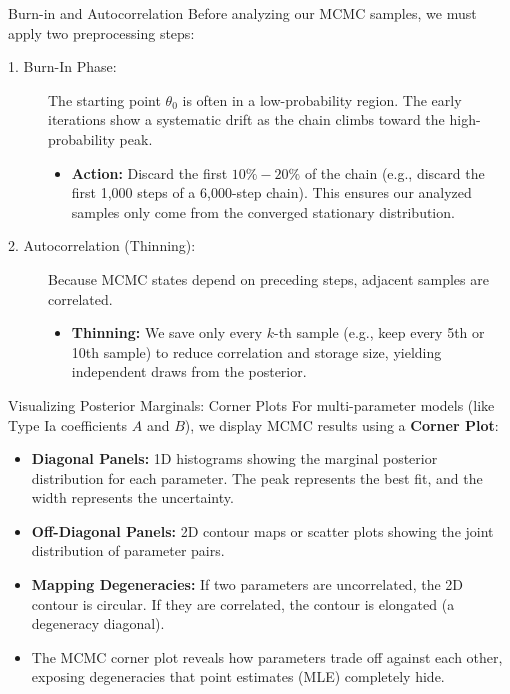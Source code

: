\documentclass[9pt]{beamer}
\begin{document}
\begin{frame}{Burn-in and Autocorrelation}
  Before analyzing our MCMC samples, we must apply two preprocessing steps:
  \begin{description}
    \item[1. Burn-In Phase:]
      The starting point $\theta_0$ is often in a low-probability region. The early iterations show a systematic drift as the chain climbs toward the high-probability peak.
      \begin{itemize}
        \item \textbf{Action:} Discard the first $10\% - 20\%$ of the chain (e.g., discard the first 1,000 steps of a 6,000-step chain). This ensures our analyzed samples only come from the converged stationary distribution.
      \end{itemize}
    \item[2. Autocorrelation (Thinning):]
      Because MCMC states depend on preceding steps, adjacent samples are correlated.
      \begin{itemize}
        \item \textbf{Thinning:} We save only every $k$-th sample (e.g., keep every 5th or 10th sample) to reduce correlation and storage size, yielding independent draws from the posterior.
      \end{itemize}
  \end{description}
\end{frame}

\begin{frame}{Visualizing Posterior Marginals: Corner Plots}
  For multi-parameter models (like Type Ia coefficients $A$ and $B$), we display MCMC results using a \textbf{Corner Plot}:
  \begin{itemize}
    \item \textbf{Diagonal Panels:} 1D histograms showing the marginal posterior distribution for each parameter. The peak represents the best fit, and the width represents the uncertainty.
    \item \textbf{Off-Diagonal Panels:} 2D contour maps or scatter plots showing the joint distribution of parameter pairs.
    \item \textbf{Mapping Degeneracies:}
      If two parameters are uncorrelated, the 2D contour is circular. If they are correlated, the contour is elongated (a degeneracy diagonal).
    \item The MCMC corner plot reveals how parameters trade off against each other, exposing degeneracies that point estimates (MLE) completely hide.
  \end{itemize}
\end{frame}
\end{document}
